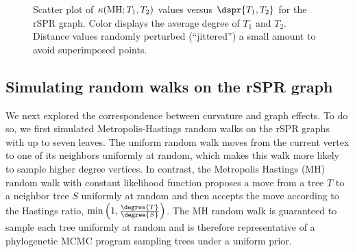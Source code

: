 \documentclass[11pt,onecolumn,conference]{IEEEtran}
\let\MYoriglatexcaption\caption
\renewcommand{\caption}[2][\relax]{\MYoriglatexcaption[#2]{#2}}
\newcommand{\MH}{\operatorname{MH}}
\newcommand{\curvature}[2][]{%
    \ifthenelse{\equal{#1}{}}%
		{\kappa(#2)}%
		{\kappa_{#1}(#2)}%
}
\begin{document}
\begin{figure}
    \caption{Scatter plot of $\curvature{\MH; T_1,T_2}$ values versus $\dspr{T_1,T_2}$ for the rSPR graph. Color displays the average degree of $T_1$ and $T_2$. Distance values randomly perturbed (``jittered'') a small amount to avoid superimposed points.}
	\label{fig:rspr-scatter}
\end{figure}

\subsection{Simulating random walks on the rSPR graph}
\label{sec:random_walks}
We next explored the correspondence between curvature and graph effects.
To do so, we first simulated Metropolis-Hastings random walks on the rSPR graphs with up to seven leaves.
The uniform random walk moves from the current vertex to one of its neighbors uniformly at random, which makes this walk more likely to sample higher degree vertices.
In contrast, the Metropolis Hastings (MH) random walk with constant likelihood function proposes a move from a tree $T$ to a neighbor tree $S$ uniformly at random and then accepts the move according to the Hastings ratio, $\min\left(1, \frac{\degree{T}}{\degree{S}}\right)$.
The MH random walk is guaranteed to sample each tree uniformly at random and is therefore representative of a phylogenetic MCMC program sampling trees under a uniform prior.
\end{document}
